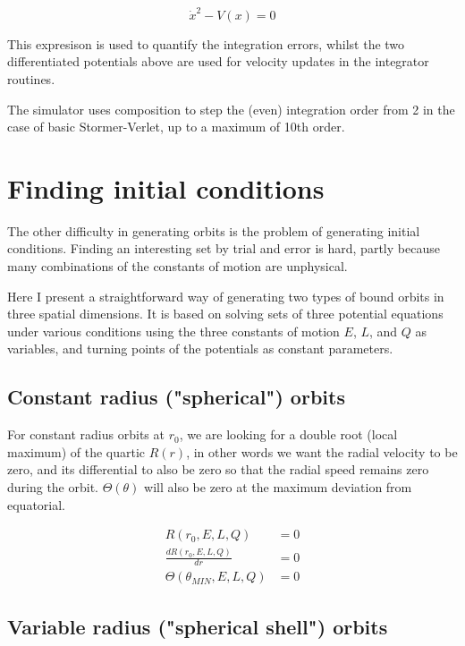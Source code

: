 \documentclass[11pt]{article}
\begin{document}
\begin{equation}
\dot x^2 - V(x) = 0
\end{equation}

This expresison is used to quantify the integration errors, whilst the two differentiated potentials above are used for velocity updates in the integrator routines.

The simulator uses composition \cite{hairer} to step the (even) integration order from 2 in the case of basic Stormer-Verlet, up to a maximum of 10th order.

\section{Finding initial conditions}

The other difficulty in generating orbits is the problem of generating initial conditions.  Finding an interesting set by trial and error is hard, partly because many combinations of the constants of motion are unphysical.

Here I present a straightforward way of generating two types of bound orbits in three spatial dimensions.  It is based on solving sets of three potential equations under various conditions using the three constants of motion $E$, $L$, and $Q$ as variables, and turning points of the potentials as constant parameters.

\subsection{Constant radius ("spherical") orbits}

For constant radius orbits at $r_0$, we are looking for a double root (local maximum) of the quartic $R(r)$, in other words we want the radial velocity to be zero, and its differential to also be zero so that the radial speed remains zero during the orbit.  $\Theta (\theta)$ will also be zero at the maximum deviation from equatorial.

\begin{align}
R(r_0, E, L, Q) &= 0 \\
\frac{d R(r_0, E, L, Q)}{d r} &= 0 \\
\Theta(\theta_{MIN}, E, L, Q) &= 0
\end{align}

\subsection{Variable radius ("spherical shell") orbits}
\end{document}
